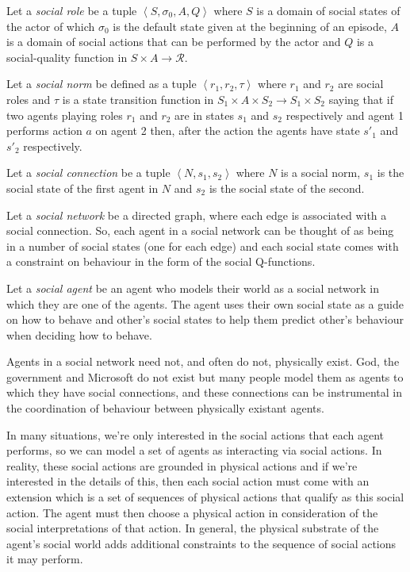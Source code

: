 \documentclass[a4paper]{article}
\begin{document}
Let a \textit{social role} be a tuple $\left<S, \sigma_0, A, Q\right>$ where $S$ is a domain of social states of the actor of which $\sigma_0$ is the default state given at the beginning of an episode, $A$ is a domain of social actions that can be performed by the actor and $Q$ is a social-quality function in $S \times A \to \mathcal{R}$. 

Let a \textit{social norm} be defined as a tuple $\left<r_1, r_2, \tau \right>$ where $r_1$ and $r_2$ are social roles and $\tau$ is a state transition function in $S_1 \times A \times S_2 \to S_1 \times S_2$ saying that if two agents playing roles $r_1$ and $r_2$ are in states $s_1$ and $s_2$ respectively and agent 1 performs action $a$ on agent 2 then, after the action the agents have state $s'_1$ and $s'_2$ respectively.

Let a \textit{social connection} be a tuple $\left<N, s_1, s_2 \right>$ where $N$ is a social norm, $s_1$ is the social state of the first agent in $N$ and $s_2$ is the social state of the second.

Let a \textit{social network} be a directed graph, where each edge is associated with a social connection. So, each agent in a social network can be thought of as being in a number of social states (one for each edge) and each social state comes with a constraint on behaviour in the form of the social Q-functions.

Let a \textit{social agent} be an agent who models their world as a social network in which they are one of the agents. The agent uses their own social state as a guide on how to behave and other's social states to help them predict other's behaviour when deciding how to behave. 

Agents in a social network need not, and often do not, physically exist. God, the government and Microsoft do not exist but many people model them as agents to which they have social connections, and these connections can be instrumental in the coordination of behaviour between physically existant agents.

In many situations, we're only interested in the social actions that each agent performs, so we can model a set of agents as interacting via social actions. In reality, these social actions are grounded in physical actions and if we're interested in the details of this, then each social action must come with an extension which is a set of sequences of physical actions that qualify as this social action. The agent must then choose a physical action in consideration of the social interpretations of that action. In general, the physical substrate of the agent's social world adds additional constraints to the sequence of social actions it may perform.
\end{document}
